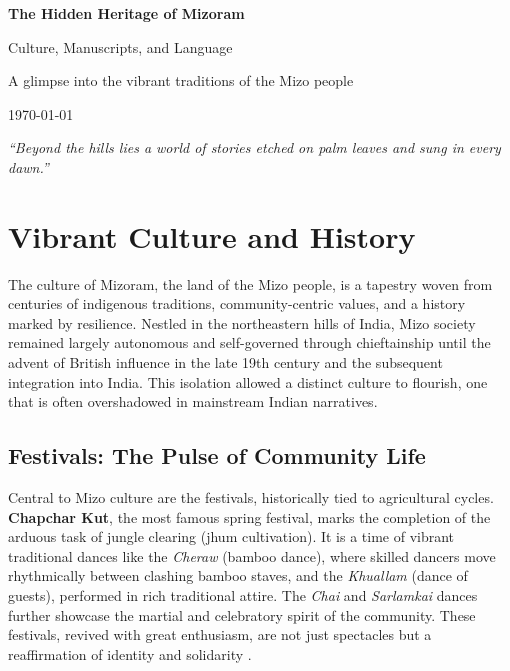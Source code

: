 \documentclass[12pt]{article}
\begin{document}
\begin{titlepage}
    \centering
    \vspace*{2cm}
    {\huge\bfseries\color{mizoRed} The Hidden Heritage of Mizoram\par}
    \vspace{1cm}
    {\Large Culture, Manuscripts, and Language\par}
    \vspace{2cm}
    {\large A glimpse into the vibrant traditions of the Mizo people\par}
    \vspace{1.5cm}
    {\large \today\par}
    \vfill
    \textit{``Beyond the hills lies a world of stories etched on palm leaves and sung in every dawn.''}
\end{titlepage}

\tableofcontents
\newpage

\section{Vibrant Culture and History}
The culture of Mizoram, the land of the Mizo people, is a tapestry woven from centuries of indigenous traditions, community-centric values, and a history marked by resilience. Nestled in the northeastern hills of India, Mizo society remained largely autonomous and self-governed through chieftainship until the advent of British influence in the late 19th century and the subsequent integration into India. This isolation allowed a distinct culture to flourish, one that is often overshadowed in mainstream Indian narratives.

\subsection{Festivals: The Pulse of Community Life}
Central to Mizo culture are the festivals, historically tied to agricultural cycles. \textbf{Chapchar Kut}, the most famous spring festival, marks the completion of the arduous task of jungle clearing (jhum cultivation). It is a time of vibrant traditional dances like the \textit{Cheraw} (bamboo dance), where skilled dancers move rhythmically between clashing bamboo staves, and the \textit{Khuallam} (dance of guests), performed in rich traditional attire. The \textit{Chai} and \textit{Sarlamkai} dances further showcase the martial and celebratory spirit of the community. These festivals, revived with great enthusiasm, are not just spectacles but a reaffirmation of identity and solidarity \cite{lalthanliana2000mizo}.
\end{document}
